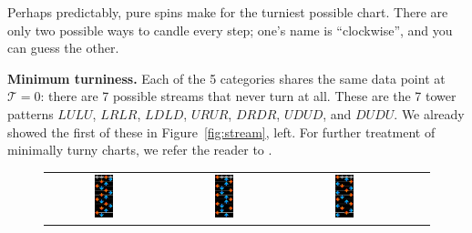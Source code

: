 \documentclass[10pt]{sigplanconf}
\begin{document}
Perhaps predictably, pure spins make for the turniest possible chart. There are only two possible ways to candle every step; one's name is ``clockwise'', and you can guess the other.

{\bf Minimum turniness.}
Each of the 5 categories shares the same data point at $\mathcal{T}=0$: there are 7 possible streams that never turn at all. These are the 7 tower patterns $LULU$, $LRLR$, $LDLD$, $URUR$, $DRDR$, $UDUD$, and $DUDU$. We already showed the first of these in Figure~\ref{fig:stream}, left. For further treatment of minimally turny charts, we refer the reader to \cite{deltamax}.

\begin{figure}[t]
	\begin{center}
	\begin{tabular}{ccccc}
		\includegraphics[width=0.17\textwidth]{result-1-3-vanilla.png} &
		\includegraphics[width=0.17\textwidth]{result-1-5-xover.png} &
		\includegraphics[width=0.17\textwidth]{result-1-6-lats.png} &

\end{tabular}
\end{center}
\end{figure}
\end{document}

